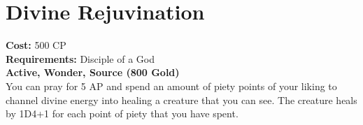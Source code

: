 \section{Divine Rejuvination}\label{wonder:divineRejuvination}
\textbf{Cost:} 500 CP\\
\textbf{Requirements:} Disciple of a God\\
\textbf{Active, Wonder, Source (800 Gold)}\\
You can pray for 5 AP and spend an amount of piety points of your liking to channel divine energy into healing a creature that you can see.
The creature heals by 1D4+1 for each point of piety that you have spent.\\
\\